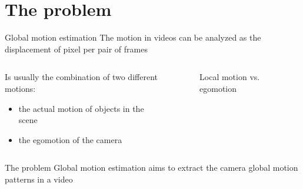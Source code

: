 \documentclass[aspectratio=1610,xcolor=dvipsnames]{beamer}
\begin{document}
\section{The problem}
\begin{frame}{Global motion estimation}
    The motion in videos can be analyzed as the displacement of pixel per pair of frames
    \bigskip

    \begin{columns}
        \begin{column}{0.45\textwidth}
            Is usually the combination of two different motions:
            \begin{itemize}
                \item the actual motion of objects in the scene
                \item the egomotion of the camera
            \end{itemize}
        \end{column}
        \begin{column}{0.45\textwidth}
            \begin{figure}[H]
                \caption{Local motion vs. egomotion}
            \end{figure}
        \end{column}
    \end{columns}

    \begin{alertblock}{The problem}
        Global motion estimation aims to extract the camera global motion patterns in a video
    \end{alertblock}
\end{frame}
\end{document}
